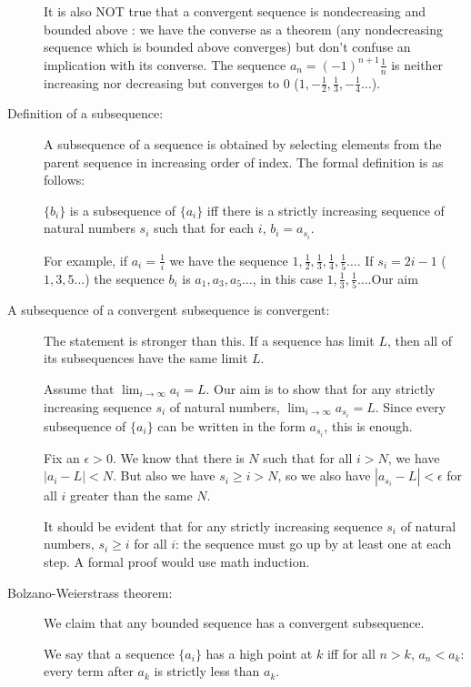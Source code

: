 \documentclass[12pt]{article}
\begin{document}
\begin{description}
It is also NOT true that a convergent sequence is nondecreasing and bounded above :  we have the converse as a theorem (any nondecreasing sequence which is bounded above converges) but don't confuse an implication with its converse.
The sequence $a_n = (-1)^{n+1}\frac1n$ is neither increasing nor decreasing but converges to 0 ($1,-\frac12,\frac13,-\frac14\ldots$).

\item[Definition of a subsequence:]

A subsequence of a sequence is obtained by selecting elements from the parent sequence in increasing order of index.  The formal definition is as follows:

$\{b_i\}$ is a subsequence of $\{a_i\}$ iff there is a strictly increasing sequence of natural numbers $s_i$ such that for each $i$, $b_i = a_{s_i}$.

For example, if $a_i = \frac 1i$ we have the sequence $1, \frac12, \frac 13, \frac 14, \frac15\ldots$.  If $s_i = 2i-1$ ($1,3,5\ldots$) the sequence $b_i$ is $a_1, a_3, a_5\ldots$, in this case $1, \frac13, \frac15\ldots$.Our aim

\item[A subsequence of a convergent subsequence is convergent:]

The statement is stronger than this.  If a sequence has limit $L$, then all of its subsequences have the same limit $L$.

Assume that $\lim_{i \rightarrow \infty}a_i=L$.  Our aim is to show that for any strictly increasing sequence $s_i$ of natural numbers, $\lim_{i \rightarrow \infty}a_{s_i}=L$.  Since every subsequence of $\{a_i\}$ can
be written in the form $a_{s_i}$, this is enough.

Fix an $\epsilon>0$.  We know that there is $N$ such that for all $i>N$, we have $|a_i-L|<N$.  But also we have $s_i\geq i >N$, so we also have $|a_{s_i}-L|<\epsilon$ for all $i$ greater than the same $N$.

It should be evident that for any strictly increasing sequence $s_i$ of natural numbers, $s_i \geq i$ for all $i$:  the sequence must go up by at least one at each step.  A formal proof would use math induction.

\item[Bolzano-Weierstrass theorem:]

We claim that any bounded sequence has a convergent subsequence.

We say that a sequence $\{a_i\}$ has a high point at $k$ iff for all $n>k$, $a_n<a_k$:  every term after $a_k$ is strictly less than $a_k$.


\end{description}
\end{document}
